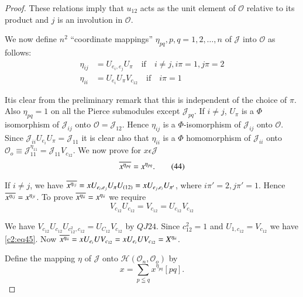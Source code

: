 \begin{proof}
These relations imply that $u_{12}$ acts as the unit element of
$\mathscr{O}$ relative to its product and $j$ is an involution in
$\mathscr{O}$.

We now define $n^{2}$ ``coordinate mappings''
$\eta_{pq},p,q=1,2,\ldots, n$ of $\mathscr{J}$ into $\mathscr{O}$ as
follows:
\begin{align*}
  \eta_{ij}&=U_{e_{i},e_{j}}U_{\pi}\quad \text{if}\quad i\neq j, i\pi=1,
  j\pi=2\tag{42}\label{c2:eq42}\\
  \eta_{ii}&=U_{e_{i}}U_{\pi}V_{c_{12}}\quad\text{if}\quad
  i\pi=1\tag{43}\label{c2:eq43} 
\end{align*}

It\pageoriginale is clear from the preliminary remark that this is
independent of the choice of $\pi$. Also $\eta_{pq}=1$ on all the
Pierce submodules except $\mathscr{J}_{pq}$. If $i\neq j$, $U_{\pi}$
is a $\Phi$ isomorphism of $\mathscr{J}_{ij}$ onto
$\mathscr{O}=\mathscr{J}_{12}$. Hence $\eta_{ij}$ is a
$\Phi$-isomorphism of $\mathscr{J}_{ij}$ onto $\mathscr{O}$. Since
$\mathscr{J}_{ii}U_{e_{i}}U_{\pi}=\mathscr{J}_{11}$ it is clear also
that $\eta_{ii}$ is a $\Phi$ homomorphism of $\mathscr{J}_{ii}$ onto
$\mathscr{O}_o\equiv\mathscr{J}_{11}^{\eta_{11}}=\mathscr{J}_{11}V_{c_{12}}$. We
now prove for $x\epsilon \mathscr{J}$
\begin{equation*}
  \overline{x^{\eta_{pq}}}=x^{\eta_{pq}}.\tag{44}\label{c2:eq44}
\end{equation*}

If $i\neq j$, we have
$\overline{x^{\eta_{ij}}}=xU_{e_{i},e_{j}}U_{\pi}U_{(12)}=xU_{e_j,e_i}U_{\pi'}$,
where $i\pi'=2, j\pi'=1$. Hence $\overline{x^{\eta_{ij}}}=x^{\eta_{ji}}$. To
prove $\overline{x^{\eta_{ii}}}=x^{\eta_{ii}}$ we require
\begin{equation*}
  V_{c_{12}}U_{c_{12}}=V_{c_{12}}=U_{c_{12}}V_{c_{12}}\tag{45}\label{c2:eq45}
\end{equation*}

We have
$V_{c_{12}}U_{c_{12}}U_{c^{2}_{12},c_{12}}=U_{C_{12}}V_{c_{12}}$ by
$QJ 24$. Since $c^{2}_{12}=1$ and $U_{1,c_{12}}=V_{c_{12}}$ we have
\eqref{c2:eq45}. Now $\overline{x^{\eta_{ii}}}=xU_{e_{i}}UV_{c_{12}}=xU_{e_{i}}U
V_{c_{12}}=X^{\eta_{ii}}$. 

Define the mapping $\eta$ of $\mathscr{J}$ onto
$\mathscr{H}(\mathscr{O}_{n},\mathscr{O}_{o})$ by
\begin{equation*}
  x=\sum\limits_{p\leqq q}x^{\eta_{pq}}[pq].\tag{46}\label{c2:eq46}
\end{equation*}


\end{proof}
